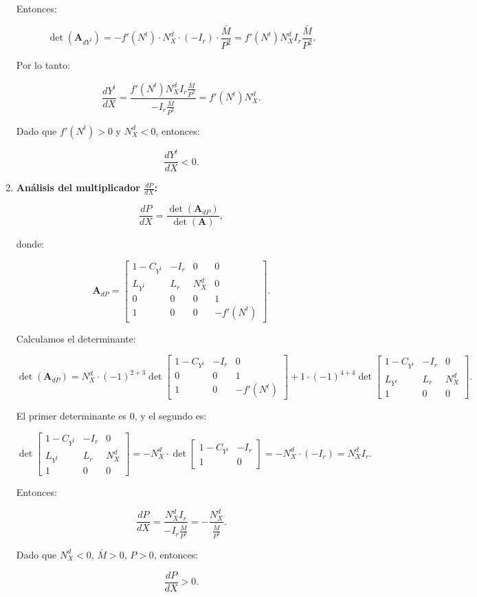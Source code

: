 \documentclass[
  doc,
  floatsintext,
  longtable,
  a4paper,
  nolmodern,
  notxfonts,
  notimes,
  colorlinks=true,linkcolor=blue,citecolor=blue,urlcolor=blue]{apa7}
\begin{document}
\begin{enumerate}
  Entonces:

  \[
  \det(\mathbf{A}_{dY^t}) = -f'(N^t) \cdot N^d_X \cdot (-I_r) \cdot \frac{\bar{M}}{P^2} = f'(N^t) N^d_X I_r \frac{\bar{M}}{P^2}.
  \]

  Por lo tanto:

  \[
  \frac{dY^t}{dX} = \frac{f'(N^t) N^d_X I_r \frac{\bar{M}}{P^2}}{-I_r \frac{\bar{M}}{P^2}} = f'(N^t) N^d_X.
  \]

  Dado que \(f'(N^t) > 0\) y \(N^d_X < 0\), entonces:

  \[
  \frac{dY^t}{dX} < 0.
  \]
\item
  \textbf{Análisis del multiplicador \(\frac{dP}{dX}\):}

  \[
  \frac{dP}{dX} = \frac{\det(\mathbf{A}_{dP})}{\det(\mathbf{A})},
  \]

  donde:

  \[
  \mathbf{A}_{dP} = \begin{bmatrix}
  1 - C_{Y^t} & -I_r & 0 & 0 \\
  L_{Y^t} & L_r & N^d_X & 0 \\
  0 & 0 & 0 & 1 \\
  1 & 0 & 0 & -f'(N^t)
  \end{bmatrix}.
  \]

  Calculamos el determinante:

  \[
  \det(\mathbf{A}_{dP}) = N^d_X \cdot (-1)^{2+3} \det \begin{bmatrix}
  1 - C_{Y^t} & -I_r & 0 \\
  0 & 0 & 1 \\
  1 & 0 & -f'(N^t)
  \end{bmatrix} + 1 \cdot (-1)^{4+4} \det \begin{bmatrix}
  1 - C_{Y^t} & -I_r & 0 \\
  L_{Y^t} & L_r & N^d_X \\
  1 & 0 & 0
  \end{bmatrix}.
  \]

  El primer determinante es 0, y el segundo es:

  \[
  \det \begin{bmatrix}
  1 - C_{Y^t} & -I_r & 0 \\
  L_{Y^t} & L_r & N^d_X \\
  1 & 0 & 0
  \end{bmatrix} = -N^d_X \cdot \det \begin{bmatrix}
  1 - C_{Y^t} & -I_r \\
  1 & 0
  \end{bmatrix} = -N^d_X \cdot (-I_r) = N^d_X I_r.
  \]

  Entonces:

  \[
  \frac{dP}{dX} = \frac{N^d_X I_r}{-I_r \frac{\bar{M}}{P^2}} = -\frac{N^d_X}{\frac{\bar{M}}{P^2}}.
  \]

  Dado que \(N^d_X < 0\), \(\bar{M} > 0\), \(P > 0\), entonces:

  \[
  \frac{dP}{dX} > 0.
  \]
\end{enumerate}
\end{document}
